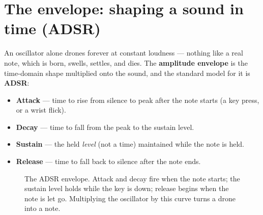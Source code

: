 \section{The envelope: shaping a sound in time (ADSR)}
\label{ch28:adsr}

An oscillator alone drones forever at constant loudness --- nothing like a real
note, which is born, swells, settles, and dies. The \textbf{amplitude envelope}
is the time-domain shape multiplied onto the sound, and the standard model for
it is \textbf{ADSR}:
\begin{itemize}
  \item \textbf{Attack} --- time to rise from silence to peak after the note
        starts (a key press, or a wrist flick).
  \item \textbf{Decay} --- time to fall from the peak to the sustain level.
  \item \textbf{Sustain} --- the held \emph{level} (not a time) maintained while
        the note is held.
  \item \textbf{Release} --- time to fall back to silence after the note ends.
\end{itemize}

\begin{figure}[H]
\centering
{}
\caption{The ADSR envelope. Attack and decay fire when the note starts; the
sustain level holds while the key is down; release begins when the note is let
go. Multiplying the oscillator by this curve turns a drone into a note.}
\label{ch28:fig-adsr}
\end{figure}

